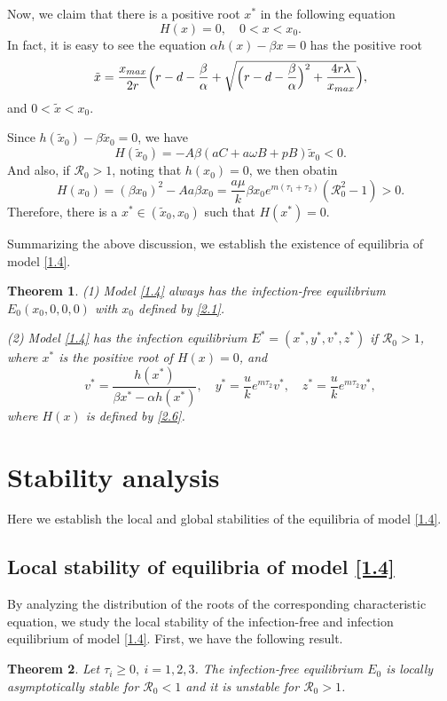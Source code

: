 \documentclass[10pt,a4paper]{amsart}
\numberwithin{equation}{section}
\newtheorem{theorem}{Theorem}[section]
\begin{document}
Now, we claim that there is a positive root $x^*$ in the following equation
\[
H(x)=0, \quad  0<x<x_0.
\]
In fact, it is easy to see the equation  $\alpha h(x)-\beta x=0$  has the positive root
$$
\tilde{x}=\frac{x_{\rm max}}{2r}\Big(r-d-\frac{\beta }{\alpha}
+\sqrt{\Big(r-d-\frac{\beta}{\alpha}\Big)^{2}+\frac{4r\lambda}{x_{\rm max}}}\Big),
$$
and  $0<\tilde{x}<x_0$.

Since $h(\tilde{x}_0)-\beta \tilde{x}_0=0$, we have
\[
H(\tilde{x}_0)=-A\beta (aC+a\omega B+pB)\tilde{x}_0<0.
\]
And also, if $\mathcal{R}_0>1$, noting that $h(x_0)=0$, we then obatin
\[
H(x_0)=(\beta x_0)^2-Aa\beta x_0=\frac{a\mu}{k}
\beta x_0e^{m(\tau_1+\tau_2)}(\mathcal{R}_0^{2}-1)>0.
\]
Therefore, there is a $x^*\in (\tilde{x}_0, x_0)$ such that $H(x^*)=0$.

Summarizing the above discussion, we  establish the existence of equilibria of 
model \eqref{1.4}.

\begin{theorem}\label{T2.2}
(1) Model \eqref{1.4} always has the infection-free equilibrium $E_0(x_0,0,0,0)$ with 
$x_0$ defined by \eqref{2.1}.

(2) Model \eqref{1.4} has the infection equilibrium $E^{*}=(x^{*}, y^{*}, v^{*}, z^{*})$ 
if $\mathcal{R}_0>1$, where  $x^*$ is the positive root of $H(x)=0$, and
\[
v^*=\frac{h(x^*)}{\beta x^*-\alpha h(x^*)},\quad 
y^*=\frac{u}{k}e^{m\tau_2}v^*,\quad z^*=\frac{u}{k}e^{m\tau_2}v^*,
\]
where  $H(x)$ is defined by \eqref{2.6}.
\end{theorem}

\section{Stability analysis}

Here  we  establish the local and global stabilities of the equilibria of 
model \eqref{1.4}.

\subsection{Local stability of equilibria of model \eqref{1.4}}

By analyzing the distribution of the roots of the corresponding characteristic equation, 
we  study the local stability of the infection-free and infection
equilibrium of model \eqref{1.4}. First, we have the following result.

\begin{theorem}\label{T3.1}
Let $\tau_{i}\geqslant0,\ i=1,2,3$. The infection-free equilibrium  $E_0$ is 
locally asymptotically stable for $\mathcal{R}_0<1$ and it is unstable for 
$\mathcal{R}_0>1$.
\end{theorem}
\end{document}
